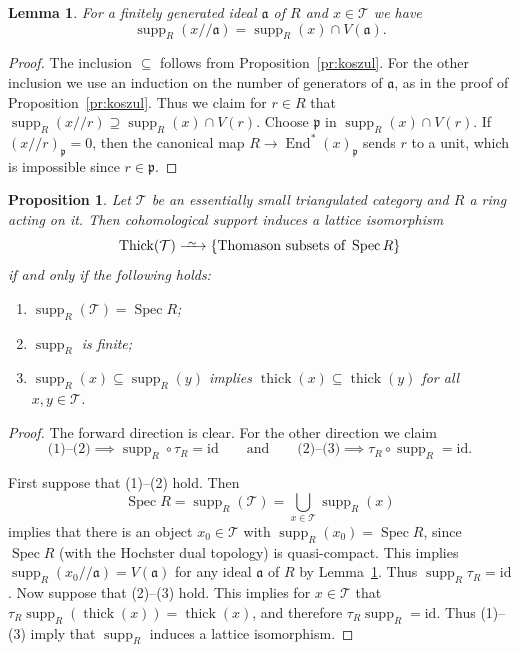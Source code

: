 \documentclass{amsart}[a4]
\newtheorem{lemma}[theorem]{Lemma}
\newtheorem{proposition}[theorem]{Proposition}
\theoremstyle{definition}
\theoremstyle{remark}
\numberwithin{equation}{section}
\newcommand{\End}{\operatorname{End}}
\newcommand{\Spec}{\operatorname{Spec}}
\newcommand{\supp}{\operatorname{supp}}
\newcommand{\thick}{\operatorname{thick}}
\newcommand{\Thick}{\operatorname{Thick}}
\newcommand{\kos}[2]{{#1}/\!\!/{#2}}
\newcommand{\longiso}{\xrightarrow{\
    \raisebox{-.6ex}[0ex][0ex]{$\scriptstyle{\sim}$}\ }}
\newcommand{\id}{\mathrm{id}}
\newcommand{\cat}{\mathcal}
\newcommand{\fa}{\mathfrak{a}}
\newcommand{\fp}{\mathfrak{p}}
\begin{document}
\begin{lemma}\label{le:koszul-supp}
  For a finitely generated ideal $\fa$ of $R$ and $x\in\cat T$ we have
  \[\supp_R(\kos x{\fa})=\supp_R(x)\cap V(\fa).\]
\end{lemma}
\begin{proof}
The inclusion $\subseteq$ follows from
Proposition~\ref{pr:koszul}. For the other inclusion we use an
induction on the number of generators of $\fa$, as in the proof of
Proposition~\ref{pr:koszul}. Thus we claim for $r\in R$ that
$\supp_R(\kos xr) \supseteq\supp_R(x)\cap V(r)$. Choose $\fp$ in
$\supp_R(x)\cap V(r)$. If $(\kos xr)_\fp=0$, then the canonical map
$R\to\End^*(x)_\fp$ sends $r$ to a unit, which is impossible since $r\in\fp$. 
\end{proof}


\begin{proposition}
  \label{pr:hopkins}
  Let $\cat T$ be an essentially small triangulated category and $R$ a ring acting on
  it.  Then cohomological support induces a lattice isomorphism
  \begin{equation*}
     \Thick(\cat T)\longiso\{\text{Thomason subsets of }\Spec
     R\}
\end{equation*}  
if and only if the following holds:
  \begin{enumerate}
  \item  $\supp_R(\cat T)=\Spec R$;  
  \item $\supp_R$ is finite;
  \item $\supp_R(x)\subseteq\supp_R(y)$ implies
    $\thick(x)\subseteq\thick(y)$ for all $x,y\in\cat T$.
\end{enumerate}
\end{proposition}

\begin{proof}
  The forward direction is clear. For the other direction we claim
  \[\text{(1)--(2)}\implies {\supp_R}\circ \tau_R=\id\qquad\text{and}\qquad
    \text{(2)--(3)}\implies \tau_R\circ{\supp_R}=\id.  \]

  First suppose that (1)--(2) hold. Then
\[\Spec R=\supp_R(\cat T)=\bigcup_{x\in\cat T}\supp_R(x)\] implies 
that there  is an object
  $x_0\in\cat T$ with $\supp_R(x_0)=\Spec R$, since $\Spec R$ (with
  the Hochster dual topology) is quasi-compact. This implies
  $\supp_R(\kos{x_0}{\fa})=V(\fa)$ for any ideal $\fa$ of $R$ by
  Lemma~\ref{le:koszul-supp}. Thus $\supp_R \tau_R=\id$.
Now suppose that (2)--(3) hold. This implies for $x\in\cat T$ that
  $\tau_R\supp_R(\thick(x))=\thick(x)$, and therefore
  $\tau_R\supp_R=\id$.  Thus (1)--(3) imply that $\supp_R$ induces a lattice isomorphism.
\end{proof}
\end{document}
